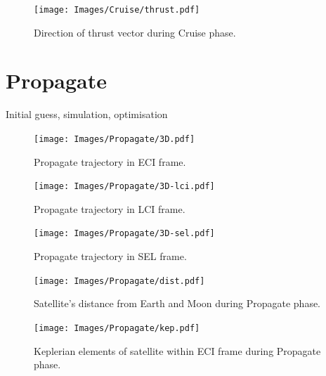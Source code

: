 \begin{figure}
\begin{center}
\texttt{[image: Images/Cruise/thrust.pdf]}
\end{center}
\caption{Direction of thrust vector during Cruise phase.}
\label{fig:Cruise-thrust}
\end{figure}


\clearpage 

\section{Propagate}
Initial guess, simulation, optimisation

\begin{figure}
\begin{center}
\texttt{[image: Images/Propagate/3D.pdf]}
\end{center}
\caption{Propagate trajectory in ECI frame.}
\label{fig:Propagate-3D}
\end{figure}

\begin{figure}
\begin{center}
\texttt{[image: Images/Propagate/3D-lci.pdf]}
\end{center}
\caption{Propagate trajectory in LCI frame.}
\label{fig:Propagate-3D-lci}
\end{figure}

\begin{figure}
\begin{center}
\texttt{[image: Images/Propagate/3D-sel.pdf]}
\end{center}
\caption{Propagate trajectory in SEL frame.}
\label{fig:Propagate-3D-sel}
\end{figure}

\begin{figure}
\begin{center}
\texttt{[image: Images/Propagate/dist.pdf]}
\end{center}
\caption{Satellite's distance from Earth and Moon during Propagate phase.}
\label{fig:Propagate-dist}
\end{figure}

\begin{figure}
\begin{center}
\texttt{[image: Images/Propagate/kep.pdf]}
\end{center}
\caption{Keplerian elements of satellite within ECI frame during Propagate phase.}
\label{fig:Propagate-kep}
\end{figure}

